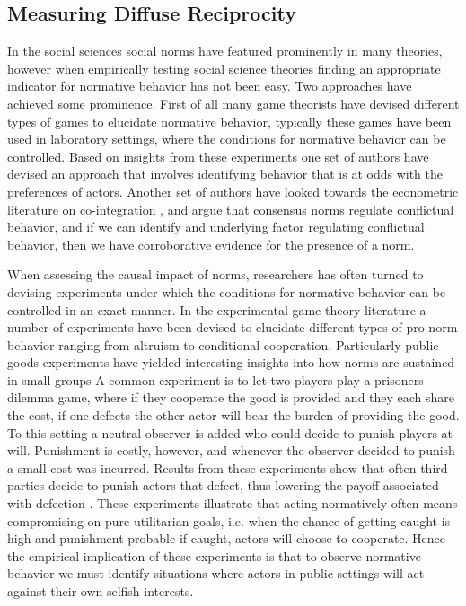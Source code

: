 \subsection{Measuring Diffuse Reciprocity}

In the social sciences social norms have featured prominently in many theories, however when empirically testing social science theories finding an appropriate indicator for normative behavior has not been easy. Two approaches have achieved some prominence. First of all many game theorists have devised different types of games to elucidate normative behavior, typically these games have been used in laboratory settings, where the conditions for normative behavior can be controlled. Based on insights from these experiments one set of authors have devised an approach that involves identifying behavior that is at odds with the preferences of actors. Another set of authors have looked towards the econometric literature on co-integration \citetext{see \citealt{Beck1992}}, and argue that consensus norms regulate conflictual behavior, and if we can identify and underlying factor regulating conflictual behavior, then we have corroborative evidence for the presence of a norm. 

When assessing the causal impact of norms, researchers has often turned to devising experiments under which the conditions for normative behavior can be controlled in an exact manner. In the experimental game theory literature a number of experiments have been devised to elucidate different types of pro-norm behavior ranging from altruism to conditional cooperation. Particularly public goods experiments have yielded interesting insights into how norms are sustained in small groups A common experiment is to let two players play a prisoners dilemma game, where if they cooperate the good is provided and they each share the cost, if one defects the other actor will bear the burden of providing the good. To this setting a neutral observer is added who could decide to punish players at will. Punishment is costly, however, and whenever the observer decided to punish a small cost was incurred. Results from these experiments show that often third parties decide to punish actors that defect, thus lowering the payoff associated with defection \citetext{see \citealt{FehrFischbacher2004} for an overview}. These experiments illustrate that acting normatively often means compromising on pure utilitarian goals, i.e. when the chance of getting caught is high and punishment probable if caught, actors will choose to cooperate. Hence the empirical implication of these experiments is that to observe normative behavior we must identify situations where actors in public settings will act against their own selfish interests.  

